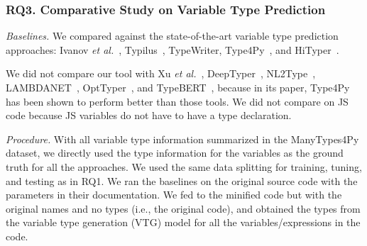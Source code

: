 

\subsubsection{RQ3. Comparative Study on Variable Type Prediction\\}

{\em Baselines.} We compared {\tool} against the state-of-the-art
  variable type prediction approaches: Ivanov {\em et
  al.}~\cite{ivanov21predicting}, Typilus~\cite{typilus-pldi20},
  TypeWriter\cite{typewriter-fse20}, Type4Py~\cite{Type4Py-icse22},
  and HiTyper~\cite{HiTyper-icse22}.


We did not compare our tool with Xu {\em et al.}~\cite{xu-fse16},
DeepTyper~\cite{DeepTyper-fse18}, NL2Type~\cite{nl2type-icse19},
LAMBDANET~\cite{LambdaNet-iclr20}, OptTyper~\cite{optyper20}, and
TypeBERT~\cite{typeBERT-fse21}, because in its paper, Type4Py has been
shown to perform better than those tools.
We did not compare on JS code because JS variables do not have to have
a type declaration.


\textit{Procedure.}  With all variable type information summarized in
the ManyTypes4Py dataset, we directly used the type information for
the variables as the ground truth for all the approaches. We used the
same data splitting for training, tuning, and testing as in RQ1. We
ran the baselines on the original source code with the parameters in
their documentation. We fed to {\tool} the minified code but with the
original names and no types (i.e., the original code), and obtained
the types from the variable type generation (VTG) model for all the
variables/expressions in the code.

